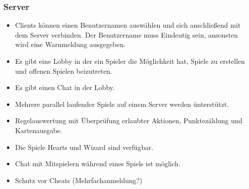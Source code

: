\documentclass{article}
\begin{document}
\subsubsection{\gls{Server}}
\begin{itemize}
	\item \glspl{Client} können einen Benutzernamen auswählen und sich anschließend mit dem Server verbinden.
		Der Benutzername muss Eindeutig sein, ansonsten wird eine Warnmeldung ausgegeben.
	\item Es gibt eine \gls{Lobby} in der ein Spieler die Möglichkeit hat, Spiele zu erstellen und offenen Spielen beizutreten.
	\item Es gibt einen Chat in der \gls{Lobby}.
	\item Mehrere parallel laufender Spiele auf einem Server werden ünterstützt.
	\item Regelauswertung mit Überprüfung erlaubter Aktionen, Punktezählung und  Kartenausgabe.
	\item Die Spiele Hearts und Wizard sind verfügbar.	
	\item Chat mit Mitspielern während eines Spiels ist möglich.
	\item Schutz vor Cheats (Mehrfachanmeldung?)
\end{itemize}
\end{document}
